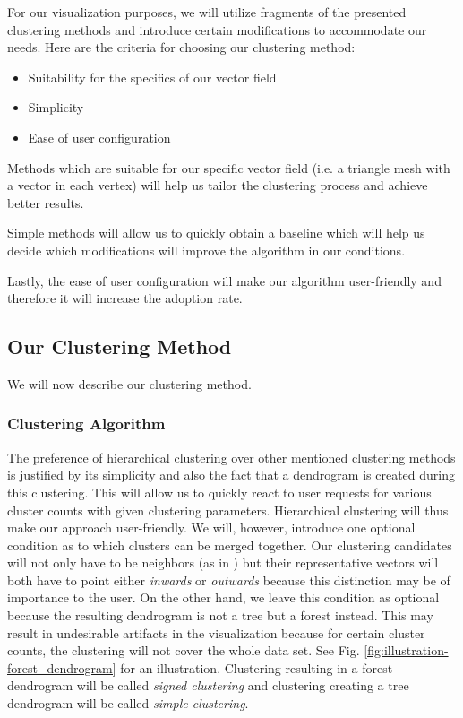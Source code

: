 For our visualization purposes, we will utilize fragments of the presented clustering methods and introduce certain modifications to accommodate our needs. Here are the criteria for choosing our clustering method:

\begin{itemize}
\item Suitability for the specifics of our vector field
\item Simplicity
\item Ease of user configuration
\end{itemize}

Methods which are suitable for our specific vector field (i.e. a triangle mesh with a vector in each vertex) will help us tailor the clustering process and achieve better results. 

Simple methods will allow us to quickly obtain a baseline which will help us decide which modifications will improve the algorithm in our conditions. 

Lastly, the ease of user configuration will make our algorithm user-friendly and therefore it will increase the adoption rate.

\subsection{Our Clustering Method}
\label{subsec:analysis-field_clustering-our_method}

We will now describe our clustering method.

\subsubsection{Clustering Algorithm}

The preference of hierarchical clustering over other mentioned clustering methods is justified by its simplicity and also the fact that a dendrogram is created during this clustering. This will allow us to quickly react to user requests for various cluster counts with given clustering parameters. Hierarchical clustering will thus make our approach user-friendly. We will, however, introduce one optional condition as to which clusters can be merged together. Our clustering candidates will not only have to be neighbors (as in \citet{Telea99}) but their representative vectors will both have to point either {\it inwards} or {\it outwards} because this distinction may be of importance to the user. On the other hand, we leave this condition as optional because the resulting dendrogram is not a tree but a forest instead. This may result in undesirable artifacts in the visualization because for certain cluster counts, the clustering will not cover the whole data set. See Fig. \ref{fig:illustration-forest_dendrogram} for an illustration. Clustering resulting in a forest dendrogram will be called {\it signed clustering} and clustering creating a tree dendrogram will be called {\it simple clustering}.

